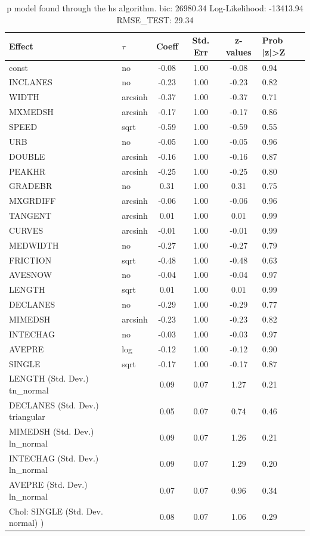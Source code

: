 \begin{table}
	\caption{p model found through the hs algorithm. bic: 26980.34 Log-Likelihood: -13413.94 RMSE_TEST: 29.34}
	\begin{center}
		\begin{tabular}{|l|l|c|c|c|l|}
			\hline
			Effect & $\tau$ & Coeff & Std. Err & z-values & Prob |z|>Z \\
			\hline
			const & no & -0.08 & 1.00 & -0.08 & 0.94 \\
			\hline
			INCLANES & no & -0.23 & 1.00 & -0.23 & 0.82 \\
			\hline
			WIDTH & arcsinh & -0.37 & 1.00 & -0.37 & 0.71 \\
			\hline
			MXMEDSH & arcsinh & -0.17 & 1.00 & -0.17 & 0.86 \\
			\hline
			SPEED & sqrt & -0.59 & 1.00 & -0.59 & 0.55 \\
			\hline
			URB & no & -0.05 & 1.00 & -0.05 & 0.96 \\
			\hline
			DOUBLE & arcsinh & -0.16 & 1.00 & -0.16 & 0.87 \\
			\hline
			PEAKHR & arcsinh & -0.25 & 1.00 & -0.25 & 0.80 \\
			\hline
			GRADEBR & no & 0.31 & 1.00 & 0.31 & 0.75 \\
			\hline
			MXGRDIFF & arcsinh & -0.06 & 1.00 & -0.06 & 0.96 \\
			\hline
			TANGENT & arcsinh & 0.01 & 1.00 & 0.01 & 0.99 \\
			\hline
			CURVES & arcsinh & -0.01 & 1.00 & -0.01 & 0.99 \\
			\hline
			MEDWIDTH & no & -0.27 & 1.00 & -0.27 & 0.79 \\
			\hline
			FRICTION & sqrt & -0.48 & 1.00 & -0.48 & 0.63 \\
			\hline
			AVESNOW & no & -0.04 & 1.00 & -0.04 & 0.97 \\
			\hline
			LENGTH & sqrt & 0.01 & 1.00 & 0.01 & 0.99 \\
			\hline
			DECLANES & no & -0.29 & 1.00 & -0.29 & 0.77 \\
			\hline
			MIMEDSH & arcsinh & -0.23 & 1.00 & -0.23 & 0.82 \\
			\hline
			INTECHAG & no & -0.03 & 1.00 & -0.03 & 0.97 \\
			\hline
			AVEPRE & log & -0.12 & 1.00 & -0.12 & 0.90 \\
			\hline
			SINGLE & sqrt & -0.17 & 1.00 & -0.17 & 0.87 \\
			\hline
			LENGTH (Std. Dev.) tn_normal &  & 0.09 & 0.07 & 1.27 & 0.21 \\
			\hline
			DECLANES (Std. Dev.) triangular &  & 0.05 & 0.07 & 0.74 & 0.46 \\
			\hline
			MIMEDSH (Std. Dev.) ln_normal &  & 0.09 & 0.07 & 1.26 & 0.21 \\
			\hline
			INTECHAG (Std. Dev.) ln_normal &  & 0.09 & 0.07 & 1.29 & 0.20 \\
			\hline
			AVEPRE (Std. Dev.) ln_normal &  & 0.07 & 0.07 & 0.96 & 0.34 \\
			\hline
			 Chol: SINGLE (Std. Dev. normal) ) &  & 0.08 & 0.07 & 1.06 & 0.29 \\
			\hline
		\end{tabular}
	\end{center}
\end{table}